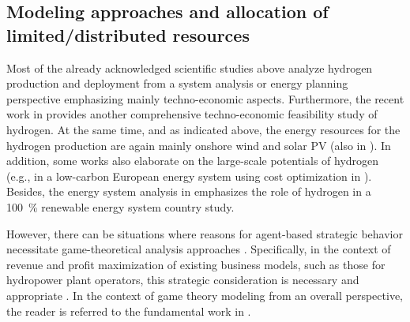 \documentclass[review]{elsarticle}
\begin{document}
\subsection{Modeling approaches and allocation of limited/distributed resources}\label{state3}
Most of the already acknowledged scientific studies above analyze hydrogen production and deployment from a system analysis or energy planning perspective emphasizing mainly techno-economic aspects. Furthermore, the recent work in \cite{qolipour2017techno} provides another comprehensive techno-economic feasibility study of hydrogen. At the same time, and as indicated above, the energy resources for the hydrogen production are again mainly onshore wind and solar PV (also in \cite{wu2020cooperative}). In addition, some works also elaborate on the large-scale potentials of hydrogen (e.g., in a low-carbon European energy system using cost optimization in \cite{blanco2018potential}). Besides, the energy system analysis in \cite{lund2009energy} emphasizes the role of hydrogen in a \SI{100}{\%} renewable energy system country study.\vspace{0.3cm}

However, there can be situations where reasons for agent-based strategic behavior necessitate game-theoretical analysis approaches \cite{wei2017stackelberg}. Specifically, in the context of revenue and profit maximization of existing business models, such as those for hydropower plant operators, this strategic consideration is necessary and appropriate \cite{fleten2007stochastic}. In the context of game theory modeling from an overall perspective, the reader is referred to the fundamental work in \cite{gintis2000game}.\vspace{0.3cm}
\end{document}
